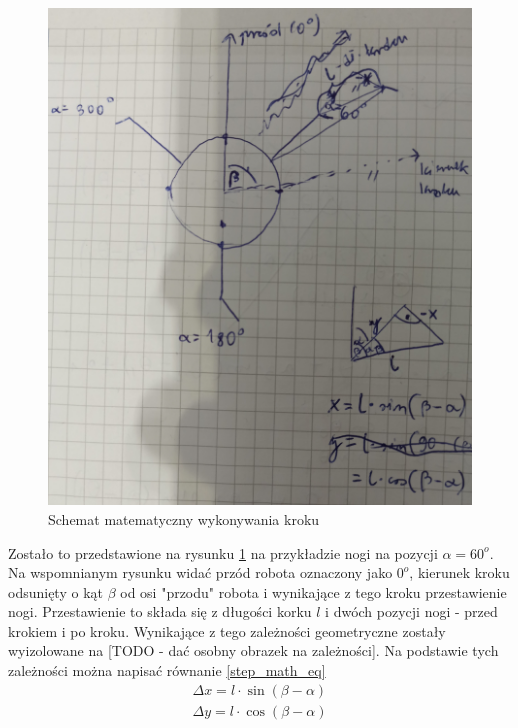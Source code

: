 \documentclass[a4paper,13pt]{article}
\begin{document}
\begin{figure}[H]
\includegraphics[width=\textwidth]{img/step_math.jpg}
\caption{Schemat matematyczny wykonywania kroku}
\label{step_math}
\end{figure}

Zostało to przedstawione na rysunku \ref{step_math} na przykładzie nogi na pozycji $\alpha = 60^o$. Na wspomnianym rysunku widać przód robota oznaczony jako $0^o$, kierunek kroku odsunięty o kąt $\beta$ od osi "przodu" robota i wynikające z tego kroku przestawienie nogi. Przestawienie to składa się z długości korku $l$ i dwóch pozycji nogi - przed krokiem i po kroku. Wynikające z tego zależności geometryczne zostały wyizolowane na [TODO - dać osobny obrazek na zależności]. Na podstawie tych zależności można napisać równanie \ref{step_math_eq}
\begin{equation} \label{step_math_eq}
\begin{split}
\Delta x = l \cdot \sin(\beta - \alpha)\\
\Delta y = l \cdot \cos(\beta - \alpha)\\
\end{split}
\end{equation}
\end{document}
